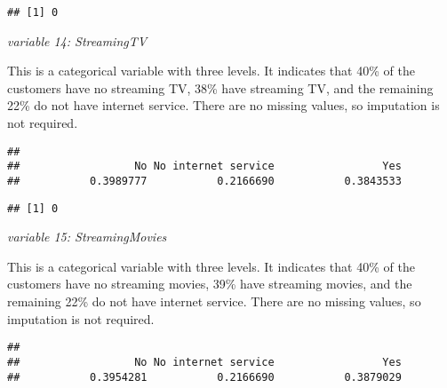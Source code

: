 \documentclass[
  a4paper]{article}
\newenvironment{Shaded}{\begin{snugshade}}{\end{snugshade}}
\newcommand{\CommentTok}[1]{\textcolor[rgb]{0.56,0.35,0.01}{\textit{#1}}}
\newcommand{\FunctionTok}[1]{\textcolor[rgb]{0.13,0.29,0.53}{\textbf{#1}}}
\newcommand{\NormalTok}[1]{#1}
\newcommand{\SpecialCharTok}[1]{\textcolor[rgb]{0.81,0.36,0.00}{\textbf{#1}}}
\begin{document}
\begin{verbatim}
## [1] 0
\end{verbatim}

\emph{variable 14: StreamingTV}

This is a categorical variable with three levels. It indicates that 40\%
of the customers have no streaming TV, 38\% have streaming TV, and the
remaining 22\% do not have internet service. There are no missing
values, so imputation is not required.

\begin{Shaded}
\end{Shaded}

\begin{verbatim}
## 
##                  No No internet service                 Yes 
##           0.3989777           0.2166690           0.3843533
\end{verbatim}

\begin{Shaded}
\end{Shaded}

\begin{verbatim}
## [1] 0
\end{verbatim}

\emph{variable 15: StreamingMovies}

This is a categorical variable with three levels. It indicates that 40\%
of the customers have no streaming movies, 39\% have streaming movies,
and the remaining 22\% do not have internet service. There are no
missing values, so imputation is not required.

\begin{Shaded}
\end{Shaded}

\begin{verbatim}
## 
##                  No No internet service                 Yes 
##           0.3954281           0.2166690           0.3879029
\end{verbatim}
\end{document}
